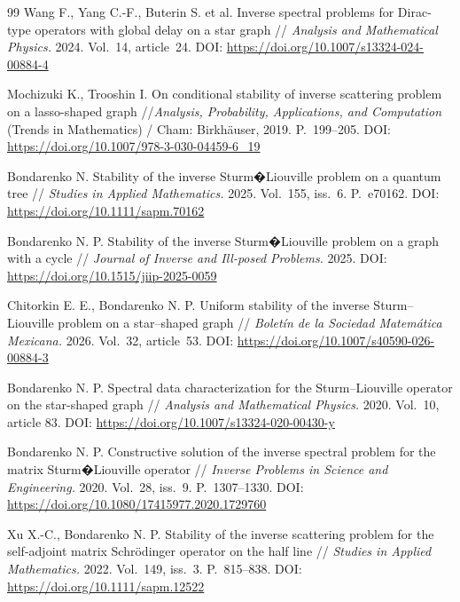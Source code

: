 \documentclass[a4paper, 12pt] {article}
\theoremstyle{plain}
\theoremstyle{remark}
\theoremstyle{plain}
\theoremstyle{definition}
\numberwithin{equation}{section}
\begin{document}
\begin{thebibliography}{99}
 Wang F., Yang C.-F., Buterin S. et al. Inverse spectral problems for Dirac-type operators with global delay on a star graph // {\it Analysis and Mathematical Physics.} 2024. Vol.~14, article~24. DOI: \url{https://doi.org/10.1007/s13324-024-00884-4}


  Mochizuki K., Trooshin I. On conditional stability of inverse scattering problem on a lasso-shaped graph //{\it  Analysis, Probability, Applications, and Computation} (Trends in Mathematics) / Cham: Birkh\"{a}user,  2019. P.~199--205. DOI:
 \url{https://doi.org/10.1007/978-3-030-04459-6\_19}

 Bondarenko N.
Stability of the inverse Sturm�Liouville problem on a quantum tree //
{\it Studies in Applied Mathematics.} 2025. Vol.~155, iss.~6. P.~e70162. DOI: \url{https://doi.org/10.1111/sapm.70162}

 Bondarenko N. P. Stability of the inverse Sturm�Liouville problem on a graph with a cycle // {\it Journal of Inverse and Ill-posed Problems.} 2025. DOI: \url{https://doi.org/10.1515/jiip-2025-0059}

  Chitorkin  E. E., Bondarenko N. P.
Uniform stability of the inverse Sturm--Liouville problem on a star--shaped graph // {\it Bolet\'{i}n de la Sociedad Matem\'{a}tica Mexicana.} 2026. Vol.~32, article~53. 
DOI: \url{https://doi.org/10.1007/s40590-026-00884-3}

Bondarenko N. P. Spectral data characterization for the Sturm--Liouville
operator on the star-shaped graph // {\it Analysis and Mathematical Physics.}
 2020. Vol.~10, article 83. DOI: \url{https://doi.org/10.1007/s13324-020-00430-y}

 Bondarenko N. P. Constructive solution of the inverse spectral
problem for the matrix Sturm�Liouville operator // {\it Inverse Problems in Science and Engineering.} 2020. Vol.~28, iss.~9.  P.~1307--1330.
DOI:  \url{https://doi.org/10.1080/17415977.2020.1729760}

 Xu X.-C., Bondarenko N. P. Stability of the inverse scattering problem for the self-adjoint matrix Schr\"odinger operator on the half line // {\it Studies in Applied Mathematics.} 2022. Vol.~149, iss.~3. P.~815--838.
DOI: \url{https://doi.org/10.1111/sapm.12522}



\end{thebibliography}
\end{document}
